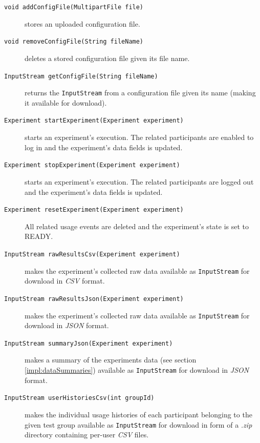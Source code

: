 \documentclass[a4paper]{usiinfbachelorproject}
\begin{document}
\begin{description}
        \item[\texttt{void addConfigFile(MultipartFile file)}] stores an uploaded configuration file.

        \item[\texttt{void removeConfigFile(String fileName)}] deletes a stored configuration file given its file name.

        \item[\texttt{InputStream getConfigFile(String fileName)}] returns the \texttt{InputStream} from a configuration file given its name 
                    (making it available for download).

        \item[\texttt{Experiment startExperiment(Experiment experiment)}] starts an experiment's execution. The related participants are enabled
                    to log in and the experiment's data fields is updated.

        \item[\texttt{Experiment stopExperiment(Experiment experiment)}] starts an experiment's execution. The related participants are 
                    logged out and the experiment's data fields is updated.

        \item[\texttt{Experiment resetExperiment(Experiment experiment)}] All related usage events are deleted
	                and the experiment's state is set to READY.

        \item[\texttt{InputStream rawResultsCsv(Experiment experiment)}] makes the experiment's collected raw data available
                    as \texttt{InputStream} for download in \emph{CSV} format.

        \item[\texttt{InputStream rawResultsJson(Experiment experiment)}] makes the experiment's collected raw data available
                    as \texttt{InputStream} for download in \emph{JSON} format.

        \item[\texttt{InputStream summaryJson(Experiment experiment)}] makes a summary of the experiments data (see section \ref{impl:dataSummaries})
                    available as \texttt{InputStream} for download in \emph{JSON} format.

        \item[\texttt{InputStream userHistoriesCsv(int groupId)}] makes the individual usage histories of each participant
                    belonging to the given test group available as \texttt{InputStream} for download in form of a \emph{.zip}
                    directory containing per-user \emph{CSV} files.


\end{description}
\end{document}
